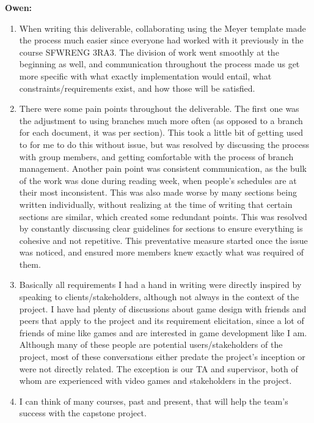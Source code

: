 \documentclass{scrreprt}
\theoremstyle{definition}
\begin{document}
	\textbf{Owen:}
	
	\begin{enumerate}
		\item When writing this deliverable, collaborating using the Meyer template made the process much easier since
		everyone had worked with it previously in the course SFWRENG 3RA3. The division of work went smoothly at the
		beginning as well, and communication throughout the process made us get more specific with what exactly
		implementation would entail, what constraints/requirements exist, and how those will be satisfied.

		\item There were some pain points throughout the deliverable. The first one was the adjustment to using branches
		much more often (as opposed to a branch for each document, it was per section). This took a little bit of getting used to
		for me to do this without issue, but was resolved by discussing the process with group members, and getting
		comfortable with the process of branch management. Another pain point was consistent communication, as the bulk of
		the work was done during reading week, when people's schedules are at their most inconsistent. This was also made
		worse by many sections being written individually, without realizing at the time of writing that certain sections are
		similar, which created some redundant points. This was resolved by constantly discussing clear guidelines for sections to
		ensure everything is cohesive and not repetitive. This preventative measure started once the issue was noticed, and
		ensured more members knew exactly what was required of them.

		\item Basically all requirements I had a hand in writing were directly inspired by speaking to clients/stakeholders,
		although not always in the context of the project. I have had plenty of discussions about game design with friends and
		peers that apply to the project and its requirement elicitation, since a lot of friends of mine like games and are
		interested in game development like I am. Although many of these people are potential users/stakeholders of the
		project, most of these conversations either predate the project's inception or were not directly related. The exception is
		our TA and supervisor, both of whom are experienced with video games and stakeholders in the project.

		\item I can think of many courses, past and present, that will help the team's success with the capstone project. 
		\begin{itemize}
	

\end{itemize}
\end{enumerate}
\end{document}

